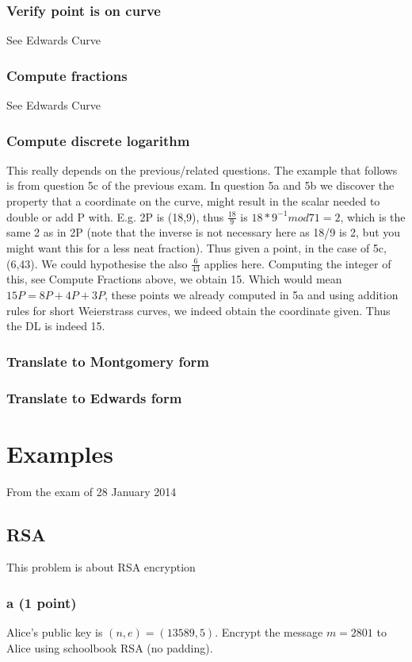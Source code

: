 \documentclass{article}
\begin{document}
\subsubsection{Verify point is on curve}
See Edwards Curve
\subsubsection{Compute fractions}
See Edwards Curve
\subsubsection{Compute discrete logarithm}
This really depends on the previous/related questions. The example that follows is from question 5c of the previous exam.
In question 5a and 5b we discover the property that a coordinate on the curve, might result in the scalar needed to double or add P with. E.g. 2P is (18,9), thus $\frac{18}{9}$ is $18*9^{-1} mod 71 = 2$, which is the same 2 as in 2P (note that the inverse is not necessary here as 18/9 is 2, but you might want this for a less neat fraction).
Thus given a point, in the case of 5c, (6,43). We could hypothesise the also $\frac{6}{43}$ applies here. Computing the integer of this, see Compute Fractions above, we obtain 15. Which would mean $15P = 8P + 4P + 3P$, these points we already computed in 5a and using addition rules for short Weierstrass curves, we indeed obtain the coordinate given. Thus the DL is indeed 15.
\subsubsection{Translate to Montgomery form}
\subsubsection{Translate to Edwards form}

\section{Examples}
From the exam of 28 January 2014
\subsection{RSA}
This problem is about RSA encryption

\subsubsection{a (1 point)}
Alice's public key is $(n, e) = (13589, 5)$. Encrypt the
message $m = 2801$ to Alice using schoolbook RSA (no padding).
\end{document}
